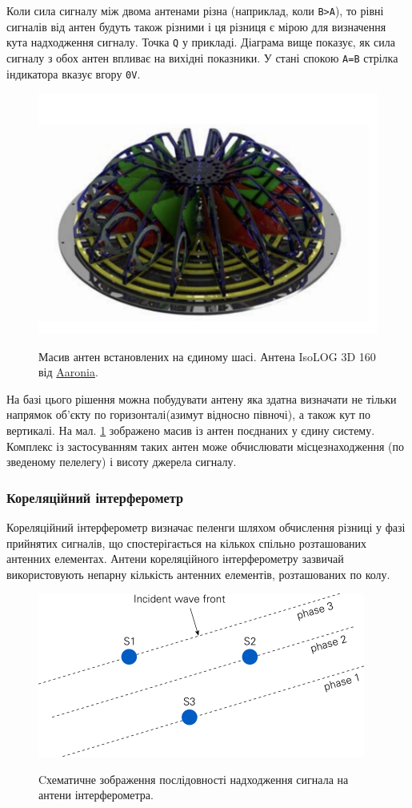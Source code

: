 \documentclass{article}
\begin{document}
Коли сила сигналу між двома антенами різна (наприклад, коли \texttt{B>A}), то рівні сигналів від антен будуть також різними і ця різниця є мірою для визначення кута надходження сигналу. Точка \texttt{Q} у прикладі. Діаграма вище показує, як сила сигналу з обох антен впливає на вихідні показники. У стані спокою \texttt{A=B} стрілка індикатора вказує вгору \texttt{0V}.

\begin{figure}[H]
\centering
{\includegraphics[width=0.6\linewidth]{images/isolog-3d-160.png}}
\caption{\label{fig:isolog-3d}Масив антен встановлених на єдиному шасі. Антена IsoLOG 3D 160 від \href{https://aaronia.com/en/produkte/antennas/isolog-3d-df}{Aaronia}.}
\end{figure}

На базі цього рішення можна побудувати антену яка здатна визначати не тільки напрямок об'єкту по горизонталі(азимут відносно півночі), а також кут по вертикалі. На мал. \ref{fig:isolog-3d} зображено масив із антен поєднаних у єдину систему. Комплекс із застосуванням таких антен може обчислювати місцезнаходження (по зведеному пелелегу) і висоту джерела сигналу. 

\subsubsection{Кореляційний інтерферометр}

Кореляційний інтерферометр визначає пеленги шляхом обчислення різниці у фазі прийнятих сигналів, що спостерігається на кількох спільно розташованих антенних елементах. Антени кореляційного інтерферометру зазвичай використовують непарну кількість антенних елементів, розташованих по колу. 

\begin{figure}[H]
	\centering
	{\includegraphics[width=0.5\linewidth]{images/df_int_wave.png}}
	\caption{Cхематичне зображення послідовності надходження сигнала на антени інтерферометра.}
\end{figure}
\end{document}
